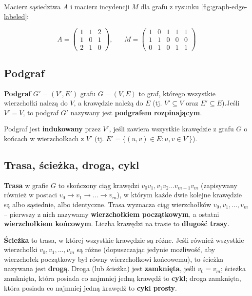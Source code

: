 Macierz sąsiedztwa $A$ i macierz incydencji $M$ dla grafu z rysunku \ref{fig:graph-edge-labeled}:

\[A = 
 \begin{pmatrix}
  1 & 1 & 2 \\
  1 & 0 & 1 \\
  2 & 1 & 0 
 \end{pmatrix}, \hspace{20pt}
 M = 
 \begin{pmatrix}
  1 & 0 & 1 & 1 & 1 \\
  1 & 1 & 0 & 0 & 0 \\
  0 & 1 & 0 & 1 & 1 
 \end{pmatrix}
\]

\subsection*{Podgraf}
\textbf{Podgraf} $G'=(V',E')$ grafu $G=(V,E)$ to graf, którego wszystkie wierzchołki nalezą do $V$, a krawędzie należą do $E$ (tj. $V' \subseteq V$ oraz $E' \subseteq E$).Jeśli $V' = V$, to podgraf $G'$ nazywany jest \textbf{podgrafem rozpinającym}\cite[229]{banachowski}. 

Podgraf jest \textbf{indukowany} przez $V'$, jeśli zawiera wszystkie krawędzie z grafu $G$ o końcach w wierzchołkach z $V'$ (tj. $E'=\{(u,v) \in E: u,v \in V' \}$)\cite[1195]{cormen}.

\subsection*{Trasa, ścieżka, droga, cykl}

\textbf{Trasa} w grafie $G$ to skończony ciąg krawędzi $v_0v_1,v_1v_2\ldots v_{m-1}v_m$ (zapisywany również w postaci $v_0 \rightarrow v_1 \rightarrow \ldots \rightarrow v_m$), w którym każde dwie kolejne krawędzie są albo sąsiednie, albo identyczne\cite[41]{wilson}. Trasa wyznacza ciąg wierzchołków $v_0,v_1,\ldots,v_m$ -- pierwszy z nich nazywamy \textbf{wierzchołkiem początkowym}, a ostatni \textbf{wierzchołkiem końcowym}. Liczba krawędzi na trasie to \textbf{długość trasy}. 

\textbf{Ścieżka} to trasa, w której wszystkie krawędzie są różne. Jeśli również wszystkie wierzchołki $v_0,v_1,\ldots,v_m$ są różne (dopuszczając jedynie możliwość, aby wierzchołek początkowy był równy wierzchołkowi końcowemu), to ścieżka nazywana jest \textbf{drogą}. Droga (lub ścieżka) jest \textbf{zamknięta}, jeśli $v_0 = v_m$; ścieżka zamknięta, która posiada co najmniej jedną krawędź to \textbf{cykl}; droga zamknięta, która posiada co najmniej jedną krawędź to \textbf{cykl prosty}.

